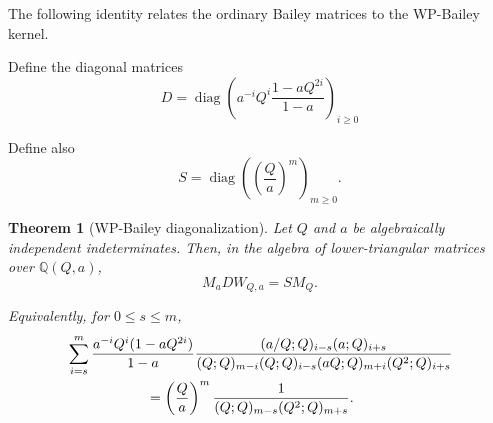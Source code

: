 \documentclass[11pt]{amsart}
\newtheorem{theorem}{Theorem}[section]
\newcommand{\Q}{\mathbb Q}
\begin{document}
The following identity relates the ordinary Bailey matrices to the WP-Bailey kernel.

Define the diagonal matrices
\begin{equation}\label{eq:D-def}
D
=
\operatorname{diag}\left(
a^{-i}Q^i\frac{1-aQ^{2i}}{1-a}
\right)_{i\geq0}
\end{equation}

Define also
\begin{equation}\label{eq:S-def}
S
=
\operatorname{diag}\left(
\left(\frac Qa\right)^m
\right)_{m\geq0}.
\end{equation}

\begin{theorem}[WP-Bailey diagonalization]
\label{thm:WP-diagonalization}
Let \(Q\) and \(a\) be algebraically independent indeterminates.
Then, in the algebra of lower-triangular matrices over \(\Q(Q,a)\),
\begin{equation}\label{eq:WP-diagonalization}
M_aDW_{Q,a}
=
SM_Q.
\end{equation}

Equivalently, for \(0\leq s\leq m\),
\begin{align}
&\sum_{i=s}^{m}
\frac{
a^{-i}Q^i(1-aQ^{2i})
}{
1-a
}
\frac{
(a/Q;Q)_{i-s}(a;Q)_{i+s}
}{
(Q;Q)_{m-i}
(Q;Q)_{i-s}
(aQ;Q)_{m+i}
(Q^2;Q)_{i+s}
}
\nonumber\\
&\hspace{20mm}
=
\left(\frac Qa\right)^m
\frac{1}{
(Q;Q)_{m-s}
(Q^2;Q)_{m+s}
}.
\label{eq:WP-entry}
\end{align}
\end{theorem}
\end{document}
